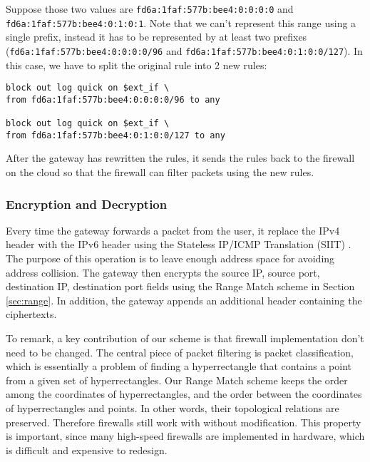 Suppose those two values are \texttt{fd6a:1faf:577b:bee4:0:0:0:0} and
\texttt{fd6a:1faf:577b:bee4:0:1:0:1}. Note that we can't represent this range using a single prefix, instead it has to be 
represented by at least two prefixes (\texttt{fd6a:1faf:577b:bee4:0:0:0:0/96} and \texttt{fd6a:1faf:577b:bee4:0:1:0:0/127}).
In this case, we have to split the original rule into 2 new rules:

\begin{lstlisting}[frame=single]
block out log quick on $ext_if \
from fd6a:1faf:577b:bee4:0:0:0:0/96 to any

block out log quick on $ext_if \
from fd6a:1faf:577b:bee4:0:1:0:0/127 to any
\end{lstlisting}


After the gateway has rewritten the rules, it sends the rules back to the firewall on the cloud so that the
firewall can filter packets using the new rules.

\subsubsection{Encryption and Decryption}
Every time the gateway forwards a packet from the user, it replace the IPv4 header with the IPv6 header 
using the Stateless IP/ICMP Translation (SIIT) \cite{rfc2765}. The purpose of this operation is to leave 
enough address space for avoiding address collision. The gateway then encrypts the source IP, source port, 
destination IP, destination port fields using the Range Match scheme in Section \ref{sec:range}. In addition,
the gateway appends an additional header containing the ciphertexts.


To remark, a key contribution of our scheme is that firewall implementation don't need to be changed. The central 
piece of packet filtering is packet classification, which is essentially a problem of finding a hyperrectangle 
that contains a point from a given set of hyperrectangles. Our Range Match scheme keeps the order among the coordinates 
of hyperrectangles, and the order between the coordinates of hyperrectangles and points. In other words, 
their topological relations are preserved. Therefore firewalls still work with \sys without modification. This 
property is important, since many high-speed firewalls are implemented in hardware, which is difficult and 
expensive to redesign.


